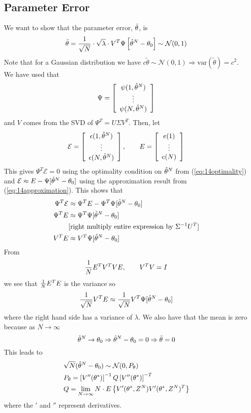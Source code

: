 \subsection{Parameter Error}
We want to show that the parameter error, $\bar{\theta}$, is
$$\bar{\theta} = \frac{1}{\sqrt{N}}\cdot\sqrt{\lambda}\cdot V^T\Psi\left[\hat{\theta}^N-\theta_0\right] \sim \mathcal{N}(0,1)$$
Note that for a Gaussian distribution we have $c\tilde{\theta}\sim\mathcal{N}(0,1)\Rightarrow \text{var}(\tilde{\theta})=c^2$. We have used that
$$\Psi = \left[\begin{array}{c} \psi(1,\hat{\theta}^N) \\ \vdots \\ \psi(N,\hat{\theta}^N) \end{array}\right]$$
and $V$ comes from the SVD of $\Psi^T=U\Sigma V^T$. Then, let
\begin{align*}
\mathcal{E} = \left[\begin{array}{c} \epsilon(1,\hat{\theta}^N) \\ \vdots \\ \epsilon(N,\hat{\theta}^N) \end{array}\right], \qquad
E = \left[\begin{array}{c} e(1) \\ \vdots \\ e(N) \end{array}\right]
\end{align*}
This gives $\Psi^T\mathcal{E} = 0$ using the optimality condition on $\hat{\theta}^N$ from (\ref{eq:14optimality}) and $\mathcal{E} \approx E-\Psi[\hat{\theta}^N-\theta_0]$ using the approximation result from (\ref{eq:14approximation}). This shows that
\begin{align*}
\Psi^T\mathcal{E} &\approx \Psi^TE-\Psi^T\Psi[\hat{\theta}^N-\theta_0] \\
\Psi^TE &\approx \Psi^T\Psi[\hat{\theta}^N-\theta_0] \\
&[\text{right multiply entire expression by } \Sigma^{-1}U^T] \\
V^TE &\approx V^T\Psi[\hat{\theta}^N-\theta_0]
\end{align*}
From
$$\frac{1}{N} E^TV^TVE, \qquad V^TV=I$$
we see that $\frac{1}{N} E^TE$ is the variance so
$$\frac{1}{\sqrt{N}}V^TE \approx \frac{1}{\sqrt{N}}V^T\Psi[\hat{\theta}^N-\theta_0]$$
where the right hand side has a variance of $\lambda$. We also have that the mean is zero because as $N\to\infty$
$$\hat{\theta}^N\to\theta_0 \Rightarrow \hat{\theta}^N-\theta_0 = 0 \Rightarrow \bar{\theta} = 0$$
This leads to
\begin{align}
\begin{split}
&\sqrt{N}(\hat{\theta}^N-\theta_0) \sim \mathcal{N}(0,P_\theta) \\
&P_\theta = \left[V''(\theta^\ast)\right]^{-1}Q\left[V''(\theta^\ast)\right]^{-T} \\
&Q = \lim_{N\to\infty}N\cdot E\left\lbrace V'(\theta^\ast,Z^N)V'(\theta^\ast,Z^N)^T \right\rbrace
\end{split}
\end{align}
where the $'$ and $''$ represent derivatives.

